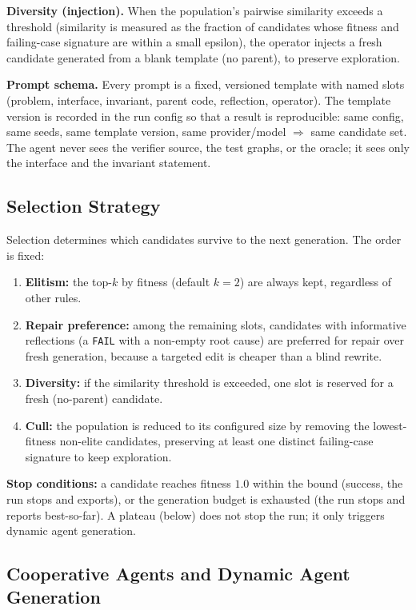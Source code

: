 \documentclass[12pt,a4paper]{article}
\begin{document}
\textbf{Diversity (injection).} When the population's pairwise similarity exceeds a threshold (similarity is measured as the fraction of candidates whose fitness and failing-case signature are within a small epsilon), the operator injects a fresh candidate generated from a blank template (no parent), to preserve exploration.

\textbf{Prompt schema.} Every prompt is a fixed, versioned template with named slots (problem, interface, invariant, parent code, reflection, operator). The template version is recorded in the run config so that a result is reproducible: same config, same seeds, same template version, same provider/model $\Rightarrow$ same candidate set. The agent never sees the verifier source, the test graphs, or the oracle; it sees only the interface and the invariant statement.

\subsection{Selection Strategy}

Selection determines which candidates survive to the next generation. The order is fixed:

\begin{enumerate}[noitemsep]
  \item \textbf{Elitism:} the top-$k$ by fitness (default $k=2$) are always kept, regardless of other rules.
  \item \textbf{Repair preference:} among the remaining slots, candidates with informative reflections (a \texttt{FAIL} with a non-empty root cause) are preferred for repair over fresh generation, because a targeted edit is cheaper than a blind rewrite.
  \item \textbf{Diversity:} if the similarity threshold is exceeded, one slot is reserved for a fresh (no-parent) candidate.
  \item \textbf{Cull:} the population is reduced to its configured size by removing the lowest-fitness non-elite candidates, preserving at least one distinct failing-case signature to keep exploration.
\end{enumerate}

\textbf{Stop conditions:} a candidate reaches fitness $1.0$ within the bound (success, the run stops and exports), or the generation budget is exhausted (the run stops and reports best-so-far). A plateau (below) does not stop the run; it only triggers dynamic agent generation.

\subsection{Cooperative Agents and Dynamic Agent Generation}
\end{document}

